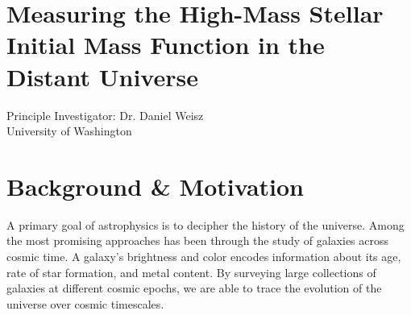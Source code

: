 \documentclass[11pt,preprint]{aastex}
\begin{document}
\section*{\Large Measuring the High-Mass Stellar Initial Mass Function in the Distant Universe}


\begin{center}
Principle Investigator: Dr. Daniel Weisz\\
University of Washington
\end{center}



\section{Background \& Motivation}
\label{sec:overview}

A primary goal of astrophysics is to decipher the history of the universe.  Among the most promising approaches has been through the study of galaxies across cosmic time. A galaxy's brightness and color encodes information about its age, rate of star formation, and metal content.  By surveying large collections of galaxies at different cosmic epochs, we are able to trace the evolution of the universe over cosmic timescales.
\end{document}
